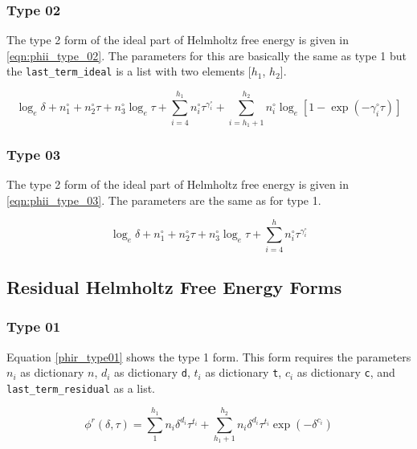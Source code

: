 \documentclass[oneside]{book}
\begin{document}
\subsubsection{Type 02}

The type 2 form of the ideal part of Helmholtz free energy is given in \ref{eqn:phii_type_02}.  The parameters for this are basically the same as type 1 but the \texttt{last\_term\_ideal} is a list with two elements [$h_1$, $h_2$].

\begin{equation}\label{eqn:phii_type_02}
	\log_e \delta + n^\circ_1 + n^\circ_2 \tau + n^\circ_3 \log_e \tau  + \sum_{i = 4}^{h_1} n^\circ_i  \tau^{\gamma^\circ_i} + \sum_{i = h_1 + 1}^{h_2} n^\circ_i \log_e \left[ 1 - \exp(-\gamma^\circ_i  \tau)\right]
\end{equation}

\subsubsection{Type 03}

The type 2 form of the ideal part of Helmholtz free energy is given in \ref{eqn:phii_type_03}. The parameters are the same as for type 1.

\begin{equation}\label{eqn:phii_type_03}
	\log_e \delta + n^\circ_1 + n^\circ_2 \tau + n^\circ_3 \log_e \tau  + \sum_{i = 4}^{h} n^\circ_i  \tau^{\gamma^\circ_i} 
\end{equation}



\subsection{Residual Helmholtz Free Energy Forms} 

\subsubsection{Type 01}
 
Equation \ref{phir_type01} shows the type 1 form.  This form requires the parameters $n_i$ as dictionary $n$, $d_i$ as dictionary \texttt{d}, $t_i$ as dictionary \texttt{t}, $c_i$ as dictionary \texttt{c}, and \texttt{last\_term\_residual} as a list. 

\begin{equation}\label{phir_type01}
	\phi^r(\delta, \tau) = \sum^{h_1}_1 n_i \delta^{d_i} \tau^{t_i} + \sum_{h_1 + 1}^{h_2} n_i \delta^{d_i} \tau^{t_i} \exp(-\delta^{c_i})
\end{equation}
\end{document}

